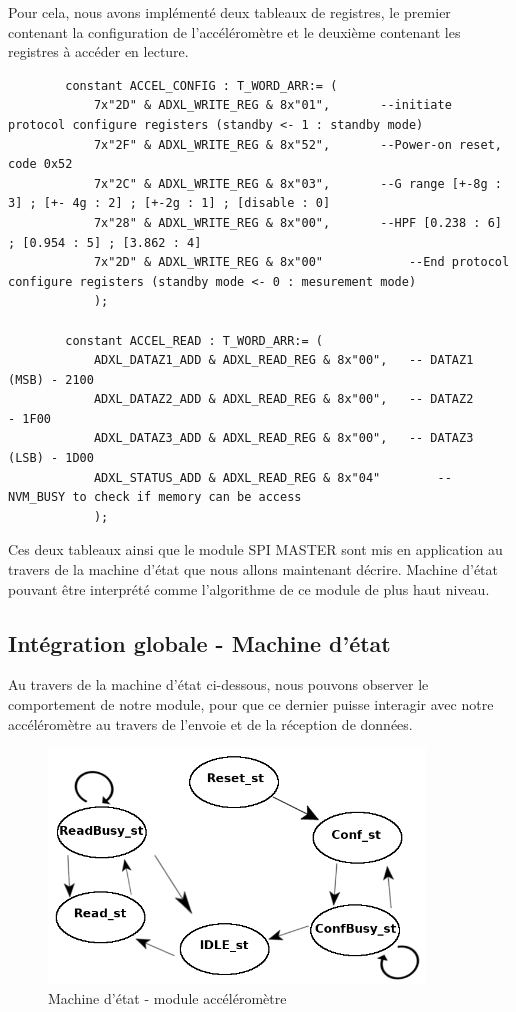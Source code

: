 \documentclass[french,a4paper,12pt]{report}
\begin{document}
			Pour cela, nous avons implémenté deux tableaux de registres, le premier contenant la configuration de l'accéléromètre et le deuxième contenant les registres à accéder en lecture.
		\begin{lstlisting}
 		constant ACCEL_CONFIG : T_WORD_ARR:= (
			7x"2D" & ADXL_WRITE_REG & 8x"01",		--initiate protocol configure registers (standby <- 1 : standby mode)
			7x"2F" & ADXL_WRITE_REG & 8x"52",		--Power-on reset, code 0x52		
			7x"2C" & ADXL_WRITE_REG & 8x"03",		--G range [+-8g : 3] ; [+- 4g : 2] ; [+-2g : 1] ; [disable : 0]
			7x"28" & ADXL_WRITE_REG & 8x"00",		--HPF [0.238 : 6] ; [0.954 : 5] ; [3.862 : 4]
			7x"2D" & ADXL_WRITE_REG & 8x"00"			--End protocol configure registers (standby mode <- 0 : mesurement mode)
			);
			
		constant ACCEL_READ : T_WORD_ARR:= (
			ADXL_DATAZ1_ADD & ADXL_READ_REG & 8x"00", 	-- DATAZ1 (MSB) - 2100
			ADXL_DATAZ2_ADD & ADXL_READ_REG & 8x"00", 	-- DATAZ2		 		- 1F00
			ADXL_DATAZ3_ADD & ADXL_READ_REG & 8x"00", 	-- DATAZ3 (LSB)	- 1D00
			ADXL_STATUS_ADD & ADXL_READ_REG & 8x"04"		-- NVM_BUSY to check if memory can be access
			);
		\end{lstlisting}
		
		Ces deux tableaux ainsi que le module SPI MASTER sont mis en application au travers de la machine d'état que nous allons maintenant décrire. Machine d'état pouvant être interprété comme l'algorithme de ce module de plus haut niveau.			
		
		\subsection{Intégration globale - Machine d'état}
				Au travers de la machine d'état ci-dessous, nous pouvons observer le comportement de notre module, pour que ce dernier puisse interagir avec notre accéléromètre au travers de l'envoie et de la réception de données.
		
			\begin{figure}[!ht]
    		\center
  			\includegraphics[width=10cm]{acc_StateMach.png}
    		\caption{Machine d'état - module accéléromètre}
			\end{figure}
			
\end{document}
